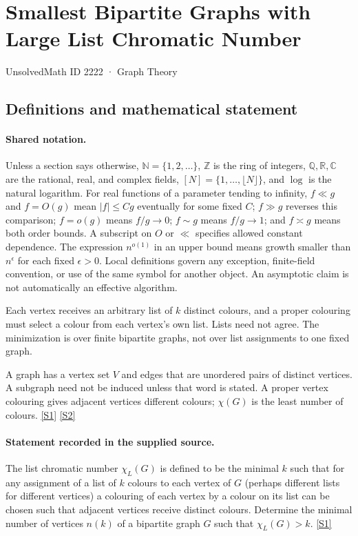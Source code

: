 \documentclass[11pt,a4paper]{article}
\newcommand{\N}{\mathbb{N}}
\newcommand{\Z}{\mathbb{Z}}
\newcommand{\Q}{\mathbb{Q}}
\newcommand{\R}{\mathbb{R}}
\newcommand{\C}{\mathbb{C}}
\newcommand{\sref}[2]{\hyperlink{source:#1:#2}{[S#2]}}
\begin{document}

\setcounter{section}{2221}

\section{Smallest Bipartite Graphs with Large List Chromatic Number}\label{2222}

{\small\sffamily UnsolvedMath ID 2222 · Graph Theory}

\subsection{Definitions and mathematical statement}

\paragraph{Shared notation.}Unless a section says otherwise, $\N=\{1,2,\ldots\}$,
$\Z$ is the ring of integers, $\Q,\R,\C$ are the rational, real, and complex
fields, $[N]=\{1,\ldots,\lfloor N\rfloor\}$, and $\log$ is the natural
logarithm. For real functions of a parameter tending to infinity,
$f\ll g$ and $f=O(g)$ mean $|f|\leq Cg$ eventually for some fixed $C$;
$f\gg g$ reverses this comparison; $f=o(g)$ means $f/g\to0$;
$f\sim g$ means $f/g\to1$; and $f\asymp g$ means both order bounds.
A subscript on $O$ or $\ll$ specifies allowed constant dependence.
The expression $n^{o(1)}$ in an upper bound means growth smaller than
$n^\epsilon$ for each fixed $\epsilon>0$. Local definitions govern any
exception, finite-field convention, or use of the same symbol for another
object. An asymptotic claim is not automatically an effective algorithm.



Each vertex receives an arbitrary list of $k$ distinct colours, and a proper colouring must select a colour from each vertex's own list. Lists need not agree. The minimization is over finite bipartite graphs, not over list assignments to one fixed graph.

A graph has a vertex set $V$ and edges that are unordered pairs of distinct vertices. A subgraph need not be induced unless that word is stated. A proper vertex colouring gives adjacent vertices different colours; $\chi(G)$ is the least number of colours. \sref{2222}{1} \sref{2222}{2}

\paragraph{Statement recorded in the supplied source.}
The list chromatic number $\chi_L(G)$ is defined to be the minimal $k$ such that for any assignment of a list of $k$ colours to each vertex of $G$ (perhaps different lists for different vertices) a colouring of each vertex by a colour on its list can be chosen such that adjacent vertices receive distinct colours.
Determine the minimal number of vertices $n(k)$ of a bipartite graph $G$ such that $\chi_L(G)>k$. \sref{2222}{1}
\end{document}
